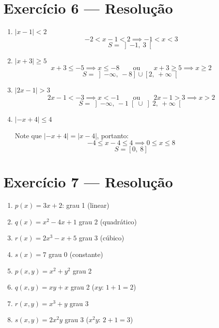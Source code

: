 \documentclass[12pt, a4paper]{article}
\begin{document}
\section*{Exercício 6 --- Resolução}

\begin{enumerate}[label=(\alph*)]

    \item $|x - 1| < 2$
    \[
        -2 < x - 1 < 2 \implies -1 < x < 3
    \]
    \[
        \boxed{S = \left]-1,\ 3\right[}
    \]

    \item $|x + 3| \geq 5$
    \[
        x + 3 \leq -5 \implies x \leq -8
        \qquad \text{ou} \qquad
        x + 3 \geq 5  \implies x \geq 2
    \]
    \[
        \boxed{S = \left]-\infty,\ -8\right] \cup \left[2,\ +\infty\right[}
    \]

    \item $|2x - 1| > 3$
    \[
        2x - 1 < -3 \implies x < -1
        \qquad \text{ou} \qquad
        2x - 1 > 3  \implies x > 2
    \]
    \[
        \boxed{S = \left]-\infty,\ -1\right[ \cup \left]2,\ +\infty\right[}
    \]

    \item $|-x + 4| \leq 4$

    Note que $|-x+4| = |x-4|$, portanto:
    \[
        -4 \leq x - 4 \leq 4 \implies 0 \leq x \leq 8
    \]
    \[
        \boxed{S = \left[0,\ 8\right]}
    \]

\end{enumerate}
\pagebreak 

\section*{Exercício 7 --- Resolução}

\begin{enumerate}[label=(\alph*)]
    \item $p(x) = 3x + 2$: \hfill grau 1 (linear)
    \item $q(x) = x^2 - 4x + 1$ \hfill grau 2 (quadrático)
    \item $r(x) = 2x^3 - x + 5$ \hfill grau 3 (cúbico)
    \item $s(x) = 7$ \hfill grau 0 (constante)
    \item $p(x,y) = x^2 + y^2$ \hfill grau 2
    \item $q(x,y) = xy + x$ \hfill grau 2 \quad ($xy$: $1+1=2$)
    \item $r(x,y) = x^3 + y$ \hfill grau 3
    \item $s(x,y) = 2x^2y$ \hfill grau 3 \quad ($x^2y$: $2+1=3$)
\end{enumerate}
\end{document}
